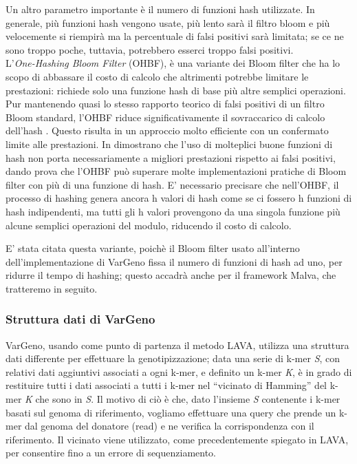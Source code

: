 \documentclass[../main.tex]{subfiles}
\begin{document}
Un altro parametro importante è il numero di funzioni hash utilizzate. In generale, più funzioni hash vengono usate, più lento sarà il filtro bloom e più velocemente si riempirà ma la percentuale di falsi positivi sarà limitata; se ce ne sono troppo poche, tuttavia, potrebbero esserci troppo falsi positivi.\\

L'\textit{One-Hashing Bloom Filter} (OHBF), è una variante dei Bloom filter che ha lo scopo di abbassare il costo di calcolo che altrimenti potrebbe limitare le prestazioni: richiede solo una funzione hash di base più altre semplici operazioni. Pur mantenendo quasi lo stesso rapporto teorico di falsi positivi di un filtro Bloom standard, l'OHBF riduce significativamente il sovraccarico di calcolo dell'hash \cite{bloomonehash}. Questo risulta in un approccio molto efficiente con un confermato limite alle prestazioni. In \cite{bloomonehash} dimostrano che l'uso di molteplici buone funzioni di hash non porta necessariamente a migliori prestazioni rispetto ai falsi positivi, dando prova che l'OHBF può superare molte implementazioni pratiche di Bloom filter con più di una funzione di hash. E' necessario precisare che nell'OHBF, il processo di hashing genera ancora h valori di hash come se ci fossero h funzioni di hash indipendenti, ma tutti gli h valori provengono da una singola funzione più alcune semplici operazioni del modulo, riducendo il costo di calcolo. 

E' stata citata questa variante, poichè il Bloom filter usato all'interno dell'implementazione di VarGeno fissa il numero di funzioni di hash ad uno, per ridurre il tempo di hashing; questo accadrà anche per il framework Malva, che tratteremo in seguito.


\subsubsection{Struttura dati di VarGeno}
VarGeno, usando come punto di partenza il metodo LAVA, utilizza una struttura dati differente per effettuare la genotipizzazione; data una serie di k-mer \textit{S}, con relativi dati aggiuntivi associati a ogni k-mer, e definito un k-mer \textit{K}, è in grado di restituire tutti i dati associati a tutti i k-mer nel “vicinato di Hamming” del k-mer \textit{K} che sono in \textit{S}. Il motivo di ciò è che, dato l'insieme \textit{S} contenente i k-mer basati sul genoma di riferimento, vogliamo effettuare una query che prende un k-mer dal genoma del donatore (read) e ne verifica la corrispondenza con il riferimento. Il vicinato viene utilizzato, come precedentemente spiegato in LAVA, per consentire fino a un errore di sequenziamento. 
\end{document}
